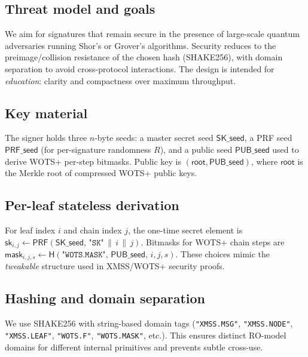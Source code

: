 \documentclass[11pt]{article}
\begin{document}
\subsection{Threat model and goals}
We aim for signatures that remain secure in the presence of large-scale quantum adversaries running Shor's or Grover's algorithms. Security reduces to the preimage/collision resistance of the chosen hash (SHAKE256), with domain separation to avoid cross-protocol interactions. The design is intended for \emph{education}: clarity and compactness over maximum throughput.

\subsection{Key material}
The signer holds three $n$-byte seeds: a master secret seed $\mathsf{SK\_seed}$, a PRF seed $\mathsf{PRF\_seed}$ (for per-signature randomness $R$), and a public seed $\mathsf{PUB\_seed}$ used to derive WOTS+ per-step bitmasks. Public key is $(\mathsf{root}, \mathsf{PUB\_seed})$, where $\mathsf{root}$ is the Merkle root of compressed WOTS+ public keys.

\subsection{Per-leaf stateless derivation}
For leaf index $i$ and chain index $j$, the one-time secret element is $\mathsf{sk}_{i,j} \gets \mathsf{PRF}(\mathsf{SK\_seed},\, \texttt{"SK"} \,\|\, i \,\|\, j)$. Bitmasks for WOTS+ chain steps are $\mathsf{mask}_{i,j,s} \gets \mathsf{H}(\texttt{"WOTS.MASK"},\, \mathsf{PUB\_seed},\, i, j, s)$. These choices mimic the \emph{tweakable} structure used in XMSS/WOTS+ security proofs.

\subsection{Hashing and domain separation}
We use SHAKE256 with string-based domain tags (\texttt{"XMSS.MSG"}, \texttt{"XMSS.NODE"}, \texttt{"XMSS.LEAF"}, \texttt{"WOTS.F"}, \texttt{"WOTS.MASK"}, etc.). This ensures distinct RO-model domains for different internal primitives and prevents subtle cross-use.
\end{document}

